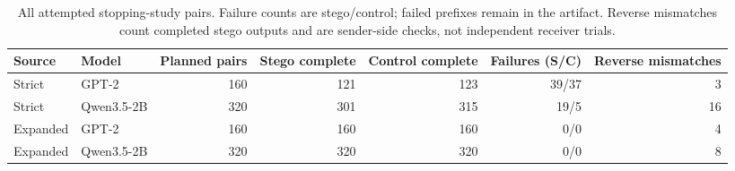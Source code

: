 \begin{table}[t]
\centering
\caption{All attempted stopping-study pairs. Failure counts are stego/control; failed prefixes remain in the artifact. Reverse mismatches count completed stego outputs and are sender-side checks, not independent receiver trials.}
\label{tab:stopping-outcomes}
\begin{tabular}{llrrrrr}
\toprule
Source & Model & Planned pairs & Stego complete & Control complete & Failures (S/C) & Reverse mismatches \\
\midrule
Strict & GPT-2 & 160 & 121 & 123 & 39/37 & 3 \\
Strict & Qwen3.5-2B & 320 & 301 & 315 & 19/5 & 16 \\
Expanded & GPT-2 & 160 & 160 & 160 & 0/0 & 4 \\
Expanded & Qwen3.5-2B & 320 & 320 & 320 & 0/0 & 8 \\
\bottomrule
\end{tabular}
\end{table}
